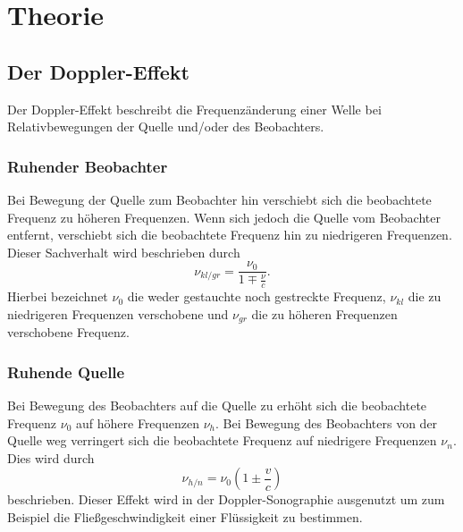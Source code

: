 \section{Theorie}
\label{sec:Theorie}
\subsection{Der Doppler-Effekt}
Der Doppler-Effekt beschreibt die Frequenzänderung einer Welle bei
Relativbewegungen der Quelle und/oder des Beobachters.
\subsubsection{Ruhender Beobachter}
Bei Bewegung der Quelle zum Beobachter hin verschiebt sich die beobachtete
Frequenz zu höheren Frequenzen.
Wenn sich jedoch die Quelle vom Beobachter entfernt, verschiebt sich die
beobachtete Frequenz hin zu niedrigeren Frequenzen. Dieser Sachverhalt wird
beschrieben durch
\begin{equation*}
  \nu_{kl/gr} = \frac{\nu_0}{1 \mp \frac{\nu}{c}}.
\end{equation*}
Hierbei bezeichnet $\nu_0$ die weder gestauchte noch gestreckte Frequenz,
$\nu_{kl}$ die zu niedrigeren Frequenzen verschobene und $\nu_{gr}$ die zu höheren
Frequenzen verschobene Frequenz.
\subsubsection{Ruhende Quelle}
Bei Bewegung des Beobachters auf die Quelle zu erhöht sich die beobachtete Frequenz
$\nu_0$ auf höhere Frequenzen $\nu_h$.
Bei Bewegung des Beobachters von der Quelle weg verringert sich die beobachtete
Frequenz auf niedrigere Frequenzen $\nu_n$. Dies wird durch
\begin{equation*}
  \nu_{h/n} = \nu_0 (1 \pm \frac{v}{c})
\end{equation*}
beschrieben.
Dieser Effekt wird in der Doppler-Sonographie ausgenutzt um zum Beispiel die
Fließgeschwindigkeit einer Flüssigkeit zu bestimmen.

